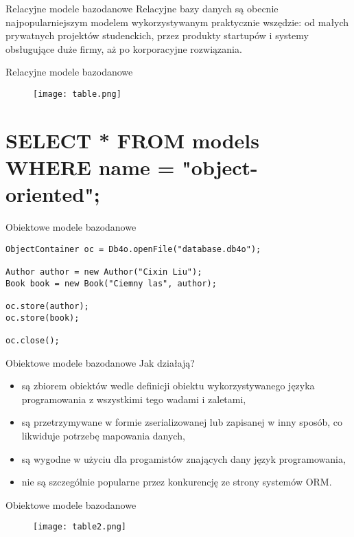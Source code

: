 \begin{frame}[fragile]{Relacyjne modele bazodanowe}
	Relacyjne bazy danych są obecnie najpopularniejszym modelem wykorzystywanym praktycznie wszędzie: od małych prywatnych projektów studenckich, przez produkty startupów i systemy obsługujące duże firmy, aż po korporacyjne rozwiązania.
\end{frame}

\begin{frame}{Relacyjne modele bazodanowe}
	\begin{figure}[t]
		\centering
		\texttt{[image: table.png]}
	\end{figure}
\end{frame}

\section{SELECT * FROM models WHERE name = "object-oriented";}

\begin{frame}[fragile]{Obiektowe modele bazodanowe}
	\begin{lstlisting}
ObjectContainer oc = Db4o.openFile("database.db4o");

Author author = new Author("Cixin Liu");
Book book = new Book("Ciemny las", author);

oc.store(author);
oc.store(book);

oc.close();
	\end{lstlisting}
\end{frame}

\begin{frame}[fragile]{Obiektowe modele bazodanowe}
	Jak działają?
	\begin{itemize}
		\item są zbiorem obiektów wedle definicji obiektu wykorzystywanego języka programowania z wszystkimi tego wadami i zaletami,
		\item są przetrzymywane w formie zserializowanej lub zapisanej w inny sposób, co likwiduje potrzebę mapowania danych,
		\item są wygodne w użyciu dla progamistów znających dany język programowania,
		\item nie są szczególnie popularne przez konkurencję ze strony systemów ORM.
	\end{itemize}
\end{frame}

\begin{frame}{Obiektowe modele bazodanowe}
	\begin{figure}[t]
		\centering
		\texttt{[image: table2.png]}
	\end{figure}
\end{frame}


